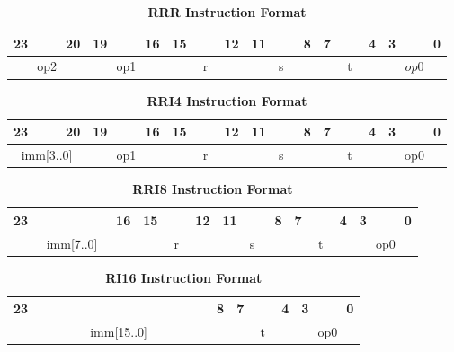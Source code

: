 \begin{table}[H]
	\caption{\textbf{RRR Instruction Format}}
	\begin{tabular}{llllllllllllllllllllllll}
       23 & & & 20 & 19 & & & 16 & 15 & & & 12 & 11 & & & 8 & 7 & & & 4 & 3 & & & 0 \\
		\hline
		\multicolumn{4}{|c|}{op2} & \multicolumn{4}{c|}{op1} & \multicolumn{4}{c|}{r} & \multicolumn{4}{c|}{s} & \multicolumn{4}{c|}{t} & \multicolumn{4}{c|}{$op0$}\\
		\hline
	\end{tabular}
\end{table}

\begin{table}[H]
	\caption{\textbf{RRI4 Instruction Format}}
	\begin{tabular}{llllllllllllllllllllllll}
		23 & & & 20 & 19 & & & 16 & 15 & & & 12 & 11 & & & 8 & 7 & & & 4 & 3 & & & 0 \\
		\hline
		\multicolumn{4}{|c|}{imm[3..0]} & \multicolumn{4}{c|}{op1} & \multicolumn{4}{c|}{r} & \multicolumn{4}{c|}{s} & \multicolumn{4}{c|}{t} & \multicolumn{4}{c|}{op0}\\
		\hline
	\end{tabular}
\end{table}

\begin{table}[H]
	\caption{\textbf{RRI8 Instruction Format}}
	\begin{tabular}{llllllllllllllllllllllll}
		23 & & & & & & & 16 & 15 & & & 12 & 11 & & & 8 & 7 & & & 4 & 3 & & & 0 \\
		\hline
		\multicolumn{8}{|c|}{imm[7..0]} & \multicolumn{4}{c|}{r} & \multicolumn{4}{c|}{s} & \multicolumn{4}{c|}{t} & \multicolumn{4}{c|}{op0}\\
		\hline
	\end{tabular}
\end{table}

\begin{table}[H]
	\caption{\textbf{RI16 Instruction Format}}
	\begin{tabular}{llllllllllllllllllllllll}
		23 & & & & & & & & & & & & & & & 8 & 7 & & & 4 & 3 & & & 0 \\
		\hline
		\multicolumn{16}{|c|}{imm[15..0]} & \multicolumn{4}{c|}{t} & \multicolumn{4}{c|}{op0}\\
		\hline
	\end{tabular}
\end{table}

